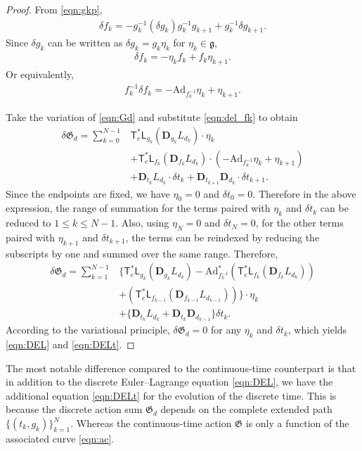 \documentclass[letterpaper, 10pt, conference]{ieeeconf}
\newcommand{\T}{\ensuremath{\mathsf{T}}}
\renewcommand{\L}{\ensuremath{\mathsf{L}}}
\newcommand{\D}{\ensuremath{\mathbf{D}}}
\newcommand{\Ad}{\ensuremath{\mathrm{Ad}}}
\newcommand{\g}{\ensuremath{\mathfrak{g}}}
\begin{document}
\begin{proof}
    From \eqref{eqn:gkp},
    \begin{align*}
        \delta f_k = - g_k^{-1}( \delta g_k ) g_k^{-1} g_{k+1} + g_k^{-1}\delta g_{k+1}.
    \end{align*}
    Since $\delta g_k$ can be written as $\delta g_k = g_k \eta_k $ for $\eta_k\in \g$, 
    \begin{align*}
        \delta f_k = - \eta_k f_k +f_k \eta_{k+1}.
    \end{align*}
    Or equivalently, 
    \begin{align}
        f_k^{-1}\delta f_k = -\Ad_{f_k^{-1}} \eta_k + \eta_{k+1}.\label{eqn:del_fk}
    \end{align}

    Take the variation of \eqref{eqn:Gd} and substitute \eqref{eqn:del_fk} to obtain
    \begin{align*}
        \delta \mathfrak{G}_d  = \sum_{k=0}^{N-1}
        & \T^*_e\L_{g_k}(\D_{g_k} L_{d_k}) \cdot \eta_k \\
        & + \T^*_e\L_{f_k}(\D_{f_k} L_{d_k}) \cdot (-\Ad_{f_k^{-1}} \eta_k + \eta_{k+1}) \\
        & + \D_{t_k} L_{d_k}\cdot \delta t_k + \D_{t_{k+1}} \D_{d_k}\cdot \delta t_{k+1}.
    \end{align*}
    Since the endpoints are fixed, we have $\eta_0=0$ and $\delta t_0 = 0$.
    Therefore in the above expression, the range of summation for the terms paired with $\eta_k$ and $\delta t_k$ can be reduced to $1\leq k\leq N-1$. 
    Also, using $\eta_N=0$ and $\delta t_N=0$, for the other terms paired with $\eta_{k+1}$ and $\delta t_{k+1}$, the terms can be reindexed by reducing the subscripts by one and summed over the same range.
    Therefore, 
    \begin{align*}
        \delta \mathfrak{G}_d  = \sum_{k=1}^{N-1}
        & \big\{ \T^*_e\L_{g_k}(\D_{g_k} L_{d_k})- \Ad^*_{f_k^{-1}} (\T^*_e\L_{f_k}(\D_{f_k} L_{d_k})) \\
        & + (\T^*_e\L_{f_{k-1}}(\D_{f_{k-1}} L_{d_{k-1}})) \big\} \cdot \eta_{k} \\
        & + \{ \D_{t_k} L_{d_k} + \D_{t_{k}} \D_{d_{k-1}} \} \delta t_k.
    \end{align*}
    According to the variational principle, $\delta\mathfrak{G}_d = 0$ for any $\eta_k$ and $\delta t_k$, which yields \eqref{eqn:DEL} and \eqref{eqn:DELt}.
\end{proof}
The most notable difference compared to the continuous-time counterpart is that in addition to the discrete Euler--Lagrange equation \eqref{eqn:DEL}, we have the additional equation \eqref{eqn:DELt} for the evolution of the discrete time. 
This is because the discrete action sum $\mathfrak{G}_d$ depends on the complete extended path $\{(t_k,g_k)\}_{k=1}^N$.
Whereas the continuous-time action $\mathfrak{G}$ is only a function of the associated curve \eqref{eqn:ac}.
\end{document}

